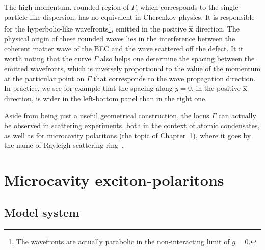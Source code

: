 The high-momentum, rounded region of $\Gamma$, which corresponds to
the single-particle-like dispersion, has no equivalent in Cherenkov
physics. It is responsible for the hyperbolic-like
wavefronts\footnote{The wavefronts are actually parabolic in the
  non-interacting limit of $g=0$.}, emitted in the positive
$\hat{\bm{x}}$ direction. The physical origin of these rounded waves
lies in the interference between the coherent matter wave of the BEC
and the wave scattered off the defect. It it worth noting that the
curve $\Gamma$ also helps one determine the spacing between the
emitted wavefronts, which is inversely proportional to the value of
the momentum at the particular point on $\Gamma$ that corresponds to
the wave propagation direction. In practice, we see for example that
the spacing along $y = 0$, in the positive $\hat{\bm{x}}$ direction,
is wider in the left-bottom panel than in the right one.

Aside from being just a useful geometrical construction, the locus
$\Gamma$ can actually be observed in scattering experiments, both in
the context of atomic condensates, as well as for microcavity
polaritons (the topic of Chapter~\ref{cha:polaritons}), where it goes
by the name of Rayleigh scattering ring~\cite{Ciuti_2005}.





\chapter{Microcavity exciton-polaritons}
\label{cha:polaritons}


\section{Model system}
\label{sec:model}



